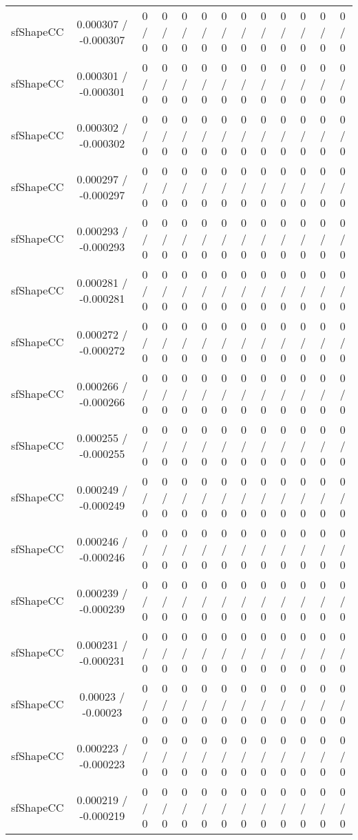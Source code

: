 \documentclass[10pt]{article}
\begin{document}
\begin{table}[htbp]
\begin{center}
\begin{tabular}{|c|c|c|c|c|c|c|c|c|c|c|c|c|}
  sfShapeCC & 0.000307 / -0.000307 & 0 / 0 & 0 / 0 & 0 / 0 & 0 / 0 & 0 / 0 & 0 / 0 & 0 / 0 & 0 / 0 & 0 / 0 & 0 / 0 & 0 / 0 \\ 
  sfShapeCC & 0.000301 / -0.000301 & 0 / 0 & 0 / 0 & 0 / 0 & 0 / 0 & 0 / 0 & 0 / 0 & 0 / 0 & 0 / 0 & 0 / 0 & 0 / 0 & 0 / 0 \\ 
  sfShapeCC & 0.000302 / -0.000302 & 0 / 0 & 0 / 0 & 0 / 0 & 0 / 0 & 0 / 0 & 0 / 0 & 0 / 0 & 0 / 0 & 0 / 0 & 0 / 0 & 0 / 0 \\ 
  sfShapeCC & 0.000297 / -0.000297 & 0 / 0 & 0 / 0 & 0 / 0 & 0 / 0 & 0 / 0 & 0 / 0 & 0 / 0 & 0 / 0 & 0 / 0 & 0 / 0 & 0 / 0 \\ 
  sfShapeCC & 0.000293 / -0.000293 & 0 / 0 & 0 / 0 & 0 / 0 & 0 / 0 & 0 / 0 & 0 / 0 & 0 / 0 & 0 / 0 & 0 / 0 & 0 / 0 & 0 / 0 \\ 
  sfShapeCC & 0.000281 / -0.000281 & 0 / 0 & 0 / 0 & 0 / 0 & 0 / 0 & 0 / 0 & 0 / 0 & 0 / 0 & 0 / 0 & 0 / 0 & 0 / 0 & 0 / 0 \\ 
  sfShapeCC & 0.000272 / -0.000272 & 0 / 0 & 0 / 0 & 0 / 0 & 0 / 0 & 0 / 0 & 0 / 0 & 0 / 0 & 0 / 0 & 0 / 0 & 0 / 0 & 0 / 0 \\ 
  sfShapeCC & 0.000266 / -0.000266 & 0 / 0 & 0 / 0 & 0 / 0 & 0 / 0 & 0 / 0 & 0 / 0 & 0 / 0 & 0 / 0 & 0 / 0 & 0 / 0 & 0 / 0 \\ 
  sfShapeCC & 0.000255 / -0.000255 & 0 / 0 & 0 / 0 & 0 / 0 & 0 / 0 & 0 / 0 & 0 / 0 & 0 / 0 & 0 / 0 & 0 / 0 & 0 / 0 & 0 / 0 \\ 
  sfShapeCC & 0.000249 / -0.000249 & 0 / 0 & 0 / 0 & 0 / 0 & 0 / 0 & 0 / 0 & 0 / 0 & 0 / 0 & 0 / 0 & 0 / 0 & 0 / 0 & 0 / 0 \\ 
  sfShapeCC & 0.000246 / -0.000246 & 0 / 0 & 0 / 0 & 0 / 0 & 0 / 0 & 0 / 0 & 0 / 0 & 0 / 0 & 0 / 0 & 0 / 0 & 0 / 0 & 0 / 0 \\ 
  sfShapeCC & 0.000239 / -0.000239 & 0 / 0 & 0 / 0 & 0 / 0 & 0 / 0 & 0 / 0 & 0 / 0 & 0 / 0 & 0 / 0 & 0 / 0 & 0 / 0 & 0 / 0 \\ 
  sfShapeCC & 0.000231 / -0.000231 & 0 / 0 & 0 / 0 & 0 / 0 & 0 / 0 & 0 / 0 & 0 / 0 & 0 / 0 & 0 / 0 & 0 / 0 & 0 / 0 & 0 / 0 \\ 
  sfShapeCC & 0.00023 / -0.00023 & 0 / 0 & 0 / 0 & 0 / 0 & 0 / 0 & 0 / 0 & 0 / 0 & 0 / 0 & 0 / 0 & 0 / 0 & 0 / 0 & 0 / 0 \\ 
  sfShapeCC & 0.000223 / -0.000223 & 0 / 0 & 0 / 0 & 0 / 0 & 0 / 0 & 0 / 0 & 0 / 0 & 0 / 0 & 0 / 0 & 0 / 0 & 0 / 0 & 0 / 0 \\ 
  sfShapeCC & 0.000219 / -0.000219 & 0 / 0 & 0 / 0 & 0 / 0 & 0 / 0 & 0 / 0 & 0 / 0 & 0 / 0 & 0 / 0 & 0 / 0 & 0 / 0 & 0 / 0 \\ 

\end{tabular}
\end{center}
\end{table}
\end{document}
